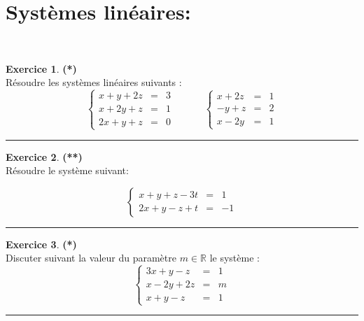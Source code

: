 \documentclass[a4paper,11pt]{article}
\theoremstyle{definition}
\newtheorem{exo}{Exercice} %
\begin{document}
\section*{Systèmes linéaires:}\hfill\\%
\begin{minipage}{1\linewidth}
	\begin{minipage}[t]{0.48\linewidth}
		\raggedright
		
		
		\begin{exo}\textbf{(*)}\quad\\[0.2cm]
	Résoudre les systèmes linéaires suivants :
	$$\left\{
	\begin{array}{rcl}
	x+y+2z&=&3\\
	x+2y+z&=&1\\
	2x+y+z&=&0
	\end{array}\right.
	\quad\quad\quad
	\left\{
	\begin{array}{rcl}
	x+2z&=&1\\
	-y+z&=&2\\
	x-2y&=&1
	\end{array}\right.$$
	
	\centering
	\rule{1\linewidth}{0.6pt}
\end{exo}
		
		
		\begin{exo}\textbf{(**)}\quad\\[0.2cm]
			Résoudre le système suivant:
			
			$$\left\{
			\begin{array}{rcl}
			x+y+z-3t&=&1\\
			2x+y-z+t&=&-1
			\end{array}\right.$$
			
			
			\centering
			\rule{1\linewidth}{0.6pt}
		\end{exo}
		
		\begin{exo}\textbf{(*)}\quad\\[0.2cm]
		Discuter suivant la valeur du paramètre $m\in\mathbb R$ le système :$$\left\{
		\begin{array}{rcl}
		3x+y-z&=&1\\
		x-2y+2z&=&m\\
		x+y-z&=&1
		\end{array}\right.$$
			
			
			\centering
			\rule{1\linewidth}{0.6pt}
		\end{exo}
		
		
		
	\end{minipage}	
	\hfill\vrule\hfill
	\begin{minipage}[t]{0.48\linewidth}
		\raggedright
		

\end{minipage}
\end{minipage}
\end{document}
